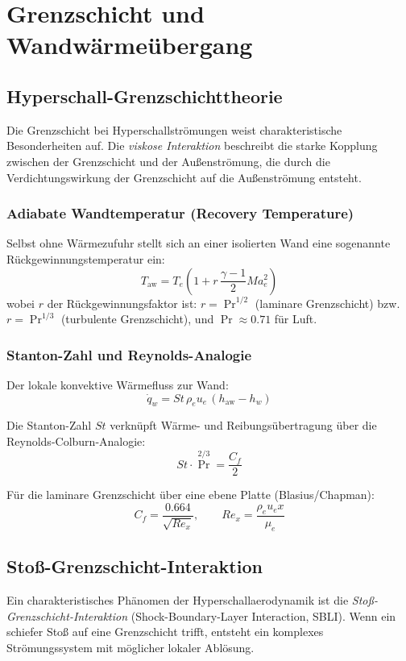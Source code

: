 ﻿\documentclass[12pt,a4paper]{article}
\newcommand{\Ma}{M\!a}
\begin{document}
\section{Grenzschicht und Wandwärmeübergang}

\subsection{Hyperschall-Grenzschichttheorie}

Die Grenzschicht bei Hyperschallströmungen weist charakteristische Besonderheiten auf.
Die \emph{viskose Interaktion} beschreibt die starke Kopplung zwischen der
Grenzschicht und der Außenströmung, die durch die Verdichtungswirkung der Grenzschicht
auf die Außenströmung entsteht.

\subsubsection{Adiabate Wandtemperatur (Recovery Temperature)}

Selbst ohne Wärmezufuhr stellt sich an einer isolierten Wand eine sogenannte
Rückgewinnungstemperatur ein:
\[
  T_{\mathrm{aw}} = T_e \left(1 + r\,\frac{\gamma-1}{2}\Ma_e^2\right)
\]
wobei $r$ der Rückgewinnungsfaktor ist: $r = \Pr^{1/2}$ (laminare Grenzschicht)
bzw. $r = \Pr^{1/3}$ (turbulente Grenzschicht), und $\Pr \approx 0.71$ für Luft.

\subsubsection{Stanton-Zahl und Reynolds-Analogie}

Der lokale konvektive Wärmefluss zur Wand:
\[
  \dot{q}_w = St\,\rho_e u_e\,(h_{\mathrm{aw}} - h_w)
\]

Die Stanton-Zahl $St$ verknüpft Wärme- und Reibungsübertragung über die
Reynolds-Colburn-Analogie:
\[
  St \cdot \Pr^{2/3} = \frac{C_f}{2}
\]

Für die laminare Grenzschicht über eine ebene Platte (Blasius/Chapman):
\[
  C_f = \frac{0.664}{\sqrt{Re_x}}, \qquad
  Re_x = \frac{\rho_e u_e x}{\mu_e}
\]

\subsection{Stoß-Grenzschicht-Interaktion}

Ein charakteristisches Phänomen der Hyperschallaerodynamik ist die
\emph{Stoß-Grenzschicht-Interaktion} (Shock-Boundary-Layer Interaction, SBLI).
Wenn ein schiefer Stoß auf eine Grenzschicht trifft, entsteht ein komplexes
Strömungssystem mit möglicher lokaler Ablösung.
\end{document}
